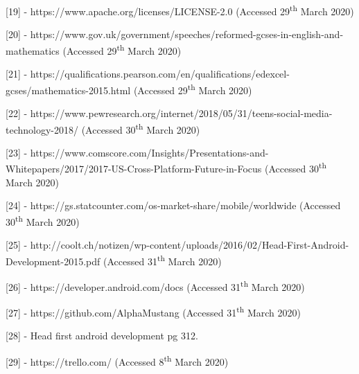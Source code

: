 \documentclass{article}
\begin{document}
[19] - https://www.apache.org/licenses/LICENSE-2.0 (Accessed 29\textsuperscript{th} March 2020) \par

[20] - https://www.gov.uk/government/speeches/reformed-gcses-in-english-and-mathematics (Accessed 29\textsuperscript{th} March 2020) \par

[21] - https://qualifications.pearson.com/en/qualifications/edexcel-gcses/mathematics-2015.html (Accessed 29\textsuperscript{th} March 2020) \par

[22] - https://www.pewresearch.org/internet/2018/05/31/teens-social-media-technology-2018/ (Accessed 30\textsuperscript{th} March 2020) \par

[23] - https://www.comscore.com/Insights/Presentations-and-Whitepapers/2017/2017-US-Cross-Platform-Future-in-Focus (Accessed 30\textsuperscript{th} March 2020) \par

[24] - https://gs.statcounter.com/os-market-share/mobile/worldwide (Accessed 30\textsuperscript{th} March 2020) \par

[25] - http://coolt.ch/notizen/wp-content/uploads/2016/02/Head-First-Android-Development-2015.pdf (Accessed 31\textsuperscript{th} March 2020) \par

[26] - https://developer.android.com/docs (Accessed 31\textsuperscript{th} March 2020) \par

[27] - https://github.com/AlphaMustang (Accessed 31\textsuperscript{th} March 2020) \par

[28] - Head first android development pg 312. \par

[29] - https://trello.com/ (Accessed 8\textsuperscript{th} March 2020)
\end{document}
